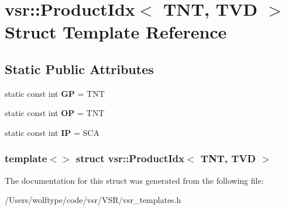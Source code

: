 \hypertarget{structvsr_1_1_product_idx_3_01_t_n_t_00_01_t_v_d_01_4}{\section{vsr\-:\-:Product\-Idx$<$ T\-N\-T, T\-V\-D $>$ Struct Template Reference}
\label{structvsr_1_1_product_idx_3_01_t_n_t_00_01_t_v_d_01_4}
}
\subsection*{Static Public Attributes}
\begin{DoxyCompactItemize}
\item 
\hypertarget{structvsr_1_1_product_idx_3_01_t_n_t_00_01_t_v_d_01_4_a0086694e90ec9116466be28cf0e9fa5e}{static const int {\bfseries G\-P} = T\-N\-T}\label{structvsr_1_1_product_idx_3_01_t_n_t_00_01_t_v_d_01_4_a0086694e90ec9116466be28cf0e9fa5e}

\item 
\hypertarget{structvsr_1_1_product_idx_3_01_t_n_t_00_01_t_v_d_01_4_a2edde926cddb3bb7daab4b72ef754b2f}{static const int {\bfseries O\-P} = T\-N\-T}\label{structvsr_1_1_product_idx_3_01_t_n_t_00_01_t_v_d_01_4_a2edde926cddb3bb7daab4b72ef754b2f}

\item 
\hypertarget{structvsr_1_1_product_idx_3_01_t_n_t_00_01_t_v_d_01_4_a6a5762ada6c87ca7cafd3e47859706b1}{static const int {\bfseries I\-P} = S\-C\-A}\label{structvsr_1_1_product_idx_3_01_t_n_t_00_01_t_v_d_01_4_a6a5762ada6c87ca7cafd3e47859706b1}

\end{DoxyCompactItemize}
\subsubsection*{template$<$$>$ struct vsr\-::\-Product\-Idx$<$ T\-N\-T, T\-V\-D $>$}



The documentation for this struct was generated from the following file\-:\begin{DoxyCompactItemize}
\item 
/\-Users/wolftype/code/vsr/\-V\-S\-R/vsr\-\_\-templates.\-h\end{DoxyCompactItemize}
